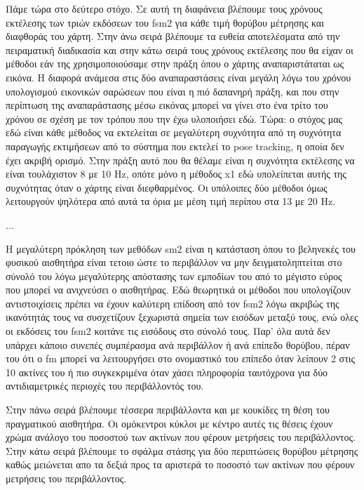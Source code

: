 \documentclass[a4paper,10pt]{article}
\begin{document}
Πάμε τώρα στο δεύτερο στόχο. Σε αυτή τη διαφάνεια βλέπουμε τους χρόνους
εκτέλεσης των τριών εκδόσεων του fsm2 για κάθε τιμή θορύβου μέτρησης και
διαφθοράς του χάρτη. Στην άνω σειρά βλέπουμε τα ευθεία αποτελέσματα από την
πειραματική διαδικασία και στην κάτω σειρά τους χρόνους εκτέλεσης που θα είχαν
οι μέθοδοι εάν της χρησιμοποιούσαμε στην πράξη όπου ο χάρτης αναπαριστάταται ως
εικόνα. Η διαφορά ανάμεσα στις δύο αναπαραστάσεις είναι μεγάλη λόγω του χρόνου
υπολογισμού εικονικών σαρώσεων που είναι η πιό δαπανηρή πράξη, και που στην
περίπτωση της αναπαράστασης μέσω εικόνας μπορεί να γίνει στο ένα τρίτο του
χρόνου σε σχέση με τον τρόπου που την έχω υλοποιήσει εδώ. Τώρα: ο στόχος μας
εδώ είναι κάθε μέθοδος να εκτελείται σε μεγαλύτερη συχνότητα από τη συχνότητα
παραγωγής εκτιμήσεων από το σύστημα που εκτελεί το pose tracking, η οποία δεν
έχει ακριβή ορισμό.  Στην πράξη αυτό που θα θέλαμε είναι η συχνότητα εκτέλεσης
να είναι τουλάχιστον 8 με 10 Hz, οπότε μόνο η μέθοδος x1 εδώ υπολείπεται
αυτής της συχνότητας όταν ο χάρτης είναι διεφθαρμένος. Οι υπόλοιπες δύο μέθοδοι
όμως λειτουργούν ψηλότερα από αυτά τα όρια με μέση τιμή περίπου στα 13 με 20
Hz.

...

Η μεγαλύτερη πρόκληση των μεθόδων sm2 είναι η κατάσταση όπου το βεληνεκές του
φυσικού αισθητήρα είναι τετοιο ώστε το περιβάλλον να μην δειγματοληπτείται στο
σύνολό του λόγω μεγαλύτερης απόστασης των εμποδίων του από το μέγιστο εύρος που
μπορεί να ανιχνεύσει ο αισθητήρας. Εδώ θεωρητικά οι μέθοδοι που υπολογίζουν
αντιστοιχίσεις πρέπει να έχουν καλύτερη επίδοση από τον fsm2 λόγω ακριβώς της
ικανότητάς τους να συσχετίζουν ξεχωριστά σημεία των εισόδων μεταξύ τους, ενώ
ολες οι εκδόσεις του fsm2 κοιτάνε τις εισόδους στο σύνολό τους.  Παρ' όλα αυτά
δεν υπάρχει κάποιο συνεπές συμπέρασμα ανά περιβάλλον ή ανά επίπεδο θορύβου,
πέραν του ότι ο fm μπορεί να λειτουργήσει στο ονομαστικό του επίπεδο όταν
λείπουν 2 στις 10 ακτίνες του ή πιο συγκεκριμένα όταν χάσει πληροφορία
ταυτόχρονα για δύο αντιδιαμετρικές περιοχές του περιβάλλοντός του.

Στην πάνω σειρά βλέπουμε τέσσερα περιβάλλοντα και με κουκίδες τη
θέση του πραγματικού αισθητήρα. Οι ομόκεντροι κύκλοι με κέντρο αυτές τις θέσεις
έχουν χρώμα ανάλογο του ποσοστού των ακτίνων που φέρουν μετρήσεις του
περιβάλλοντος. Στην κάτω σειρά βλέπουμε το σφάλμα στάσης για δύο περιπτώσεις
θορύβου μέτρησης καθώς μειώνεται απο τα δεξιά προς τα αριστερά το ποσοστό των
ακτίνων που φέρουν μετρήσεις του περιβάλλοντος.
\end{document}
